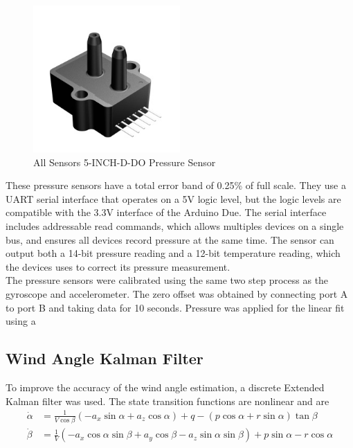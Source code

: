 \begin{figure}[H]
  \caption{All Sensors 5-INCH-D-DO Pressure Sensor} \label{allsensorsPressurePic}
  \centering
    \includegraphics[width=0.5\textwidth]{figures/allsensorsPressure.jpg}
\end{figure}

These pressure sensors have a total error band of 0.25\% of full scale. They use a UART serial interface that operates on a 5V logic level, but the logic levels are compatible with the 3.3V interface of the Arduino Due. The serial interface includes addressable read commands, which allows multiples devices on a single bus, and ensures all devices record pressure at the same time. The sensor can output both a 14-bit pressure reading and a 12-bit temperature reading, which the devices uses to correct its pressure measurement.\\

The pressure sensors were calibrated using the same two step process as the gyroscope and accelerometer. The zero offset was obtained by connecting port A to port B and taking data for 10 seconds. Pressure was applied for the linear fit using a %

\subsection{Wind Angle Kalman Filter}

To improve the accuracy of the wind angle estimation, a discrete Extended Kalman filter was used. The state transition functions are nonlinear and are
\begin{align}
\dot{\alpha} & = \frac{1}{V\cos\beta}(-a_x\sin\alpha+a_z\cos\alpha)+q-(p\cos\alpha+r\sin\alpha)\tan\beta\\
\dot{\beta} &=\frac{1}{V}(-a_x\cos\alpha\sin\beta+a_y\cos\beta-a_z\sin\alpha\sin\beta)+p\sin\alpha-r\cos\alpha
\end{align}

